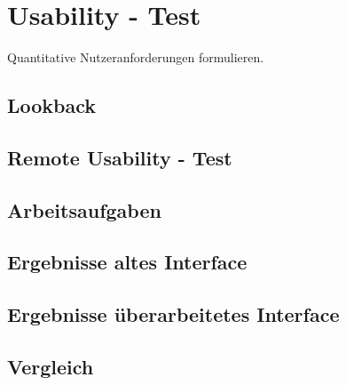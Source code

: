 \chapter{Usability - Test}\label{ch:outlook}

Quantitative Nutzeranforderungen formulieren.

\section{Lookback}
\section{Remote Usability - Test}
\section{Arbeitsaufgaben}
\section{Ergebnisse altes Interface}
\section{Ergebnisse überarbeitetes Interface}
\section{Vergleich}

